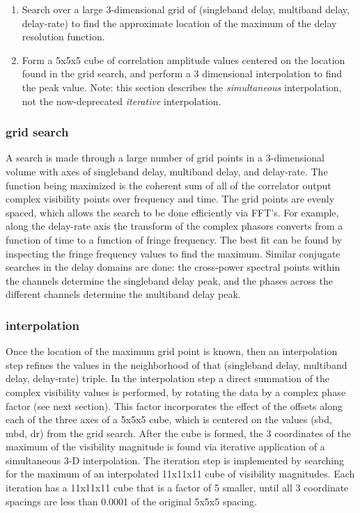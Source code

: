 \begin{enumerate}
\item Search over a large 3-dimensional grid of (singleband delay,
multiband delay, delay-rate) to find the approximate location of
the maximum of the delay resolution function.

\item Form a 5x5x5 cube of correlation amplitude 
values centered on the location found in the grid search, and
perform a 3 dimensional interpolation to find the peak value.
Note: this section describes the \textit{simultaneous} interpolation,
not the now-deprecated \textit{iterative} interpolation.
\end{enumerate}

\subsubsection{grid search}
A search is made through a large number of grid points
in a 3-dimensional volume with axes of singleband delay,
multiband delay, and delay-rate. The function being maximized
is the coherent sum of all of the correlator output
complex visibility points over frequency and time. The grid points are
evenly spaced, which allows the search to be done efficiently via
FFT's. For example, along the delay-rate axis the transform
of the complex phasors converts from a function of time
to a function of fringe frequency. The best fit can be found
by inspecting the fringe frequency values to find the maximum.
Similar conjugate searches in the delay domains are done: the
cross-power spectral points within the channels determine the
singleband delay peak, and the phases across the different
channels determine the multiband delay peak.
\subsubsection{interpolation}
Once the location of the maximum grid point is known, then an
interpolation step refines the values in the neighborhood of
that (singleband delay, multiband delay, delay-rate) triple.
In the interpolation step a direct summation of the complex visibility
values is performed, by rotating the data by a complex phase 
factor (see next section). This factor incorporates the effect of the offsets
along each of the three axes of a 5x5x5 cube, which is centered
on the values (sbd, mbd, dr) from the grid search.
After the cube is formed, the 3 coordinates of the maximum
of the visibility magnitude is found via iterative application
of a simultaneous 3-D interpolation. The iteration step is implemented
by searching for the maximum of an interpolated 11x11x11 cube
of visibility magnitudes. Each iteration has a 11x11x11 cube that
is a factor of 5 smaller, until all 3 coordinate spacings are
less than 0.0001 of the original 5x5x5 spacing.
